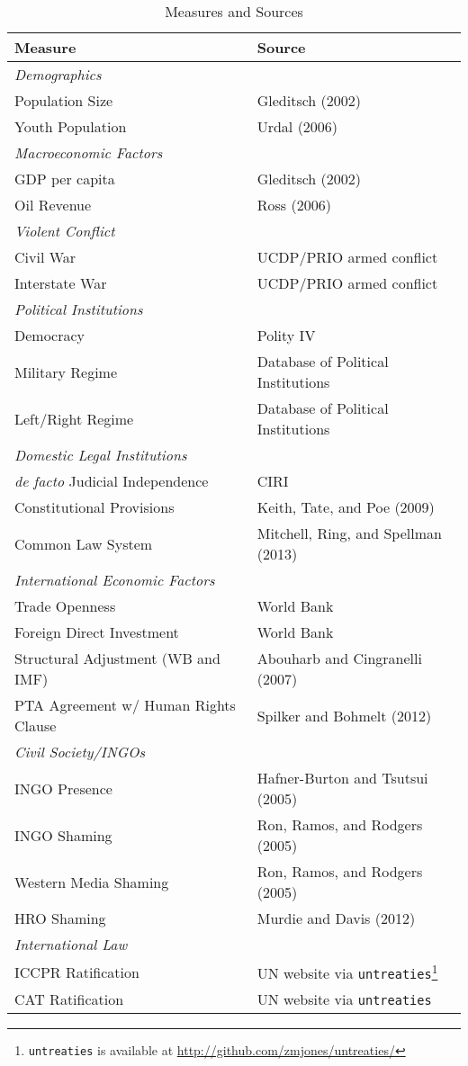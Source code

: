 \documentclass[11pt]{article}
\begin{document}
\begin{table}[htbp!] 
\caption{Measures and Sources} 
\label{tab:vars}
\centering
\begin{tabular}{ll}
Measure & Source \\
\toprule
{\em Demographics} & \\
Population Size & Gleditsch (2002) \\
Youth Population & Urdal (2006) \\ 
\midrule
{\em Macroeconomic Factors} & \\
GDP per capita & Gleditsch (2002) \\
Oil Revenue & Ross (2006) \\ 
\midrule
{\em Violent Conflict} & \\
Civil War & UCDP/PRIO armed conflict \\
Interstate War & UCDP/PRIO armed conflict \\
\midrule
{\em Political Institutions} & \\
Democracy & Polity IV \\
Military Regime & Database of Political Institutions \\
Left/Right Regime & Database of Political Institutions  \\
\midrule
{\em Domestic Legal Institutions} & \\
{\em de facto} Judicial Independence & CIRI \\
Constitutional Provisions & Keith, Tate, and Poe (2009) \\
Common Law System & Mitchell, Ring, and Spellman (2013) \\
\midrule
{\em International Economic Factors} & \\
Trade Openness & World Bank \\
Foreign Direct Investment & World Bank \\
Structural Adjustment (WB and IMF) & Abouharb and Cingranelli (2007) \\
PTA Agreement w/ Human Rights Clause & Spilker and Bohmelt (2012) \\
\midrule
{\em Civil Society/INGOs} & \\
INGO Presence & Hafner-Burton and Tsutsui (2005) \\
INGO Shaming & Ron, Ramos, and Rodgers (2005)  \\
Western Media Shaming & Ron, Ramos, and Rodgers (2005) \\
HRO Shaming & Murdie and Davis (2012) \\
\midrule
{\em International Law} & \\
ICCPR Ratification & UN website via {\tt untreaties}\footnote{{\tt untreaties} is available at \url{http://github.com/zmjones/untreaties/}} \\
CAT Ratification & UN website via {\tt untreaties} \\
\bottomrule
\end{tabular}
\end{table}
\end{document}
